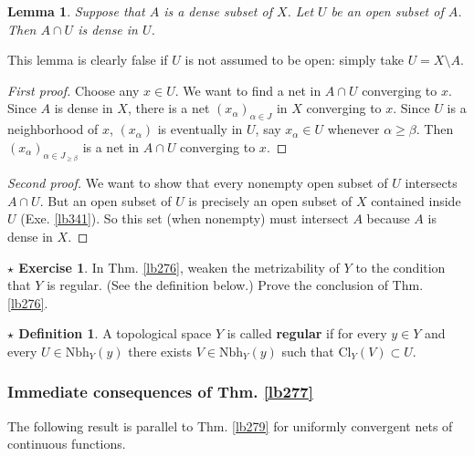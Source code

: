 \documentclass[12pt,b5paper,notitlepage]{article}
\theoremstyle{definition}
\newtheorem{sexe}[df]{$\star$ Exercise}
\newtheorem{sdf}[df]{$\star$ Definition}
\theoremstyle{plain}
\newtheorem{lm}[df]{Lemma}
\newcommand{\Nbh}{\mathrm{Nbh}}
\newcommand{\Cl}{\mathrm{Cl}}
\numberwithin{equation}{section}
\begin{document}
\begin{lm}\label{lb342}
Suppose that $A$ is a dense subset of $X$. Let $U$ be an open subset of $A$. Then $A\cap U$ is dense in $U$.
\end{lm}

This lemma is clearly false if $U$ is not assumed to be open: simply take $U=X\setminus A$.

\begin{proof}[First proof]
Choose any $x\in U$. We want to find a net in $A\cap U$ converging to $x$. Since $A$ is dense in $X$, there is a net $(x_\alpha)_{\alpha\in J}$ in $X$ converging to $x$. Since $U$ is a neighborhood of $x$, $(x_\alpha)$ is eventually in $U$, say $x_\alpha\in U$ whenever $\alpha\geq\beta$. Then $(x_\alpha)_{\alpha\in J_{\geq \beta}}$ is a net in $A\cap U$ converging to $x$.
\end{proof}

\begin{proof}[Second proof]
We want to show that every nonempty open subset of $U$ intersects $A\cap U$. But an open subset of $U$ is precisely an open subset of $X$ contained inside $U$ (Exe. \ref{lb341}). So this set (when nonempty) must intersect $A$ because $A$ is dense in $X$.
\end{proof}



\begin{sexe}
In Thm. \ref{lb276}, weaken the metrizability of $Y$ to the condition that $Y$ is regular. (See the definition below.) Prove the conclusion of Thm. \ref{lb276}.
\end{sexe}

\begin{sdf}
A topological space $Y$ is called \textbf{regular}  if for every $y\in Y$ and every $U\in\Nbh_Y(y)$ there exists $V\in\Nbh_Y(y)$ such that $\Cl_Y(V)\subset U$.
\end{sdf}









\subsubsection{Immediate consequences of Thm. \ref{lb277}}

The following result is parallel to Thm. \ref{lb279} for uniformly convergent nets of continuous functions.
\end{document}

